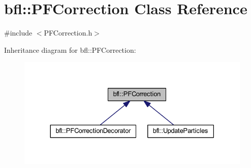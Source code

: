 \hypertarget{classbfl_1_1PFCorrection}{}\section{bfl\+:\+:P\+F\+Correction Class Reference}
\label{classbfl_1_1PFCorrection}


{\ttfamily \#include $<$P\+F\+Correction.\+h$>$}



Inheritance diagram for bfl\+:\+:P\+F\+Correction\+:
\nopagebreak
\begin{figure}[H]
\begin{center}
\leavevmode
\includegraphics[width=330pt]{classbfl_1_1PFCorrection__inherit__graph}
\end{center}
\end{figure}
